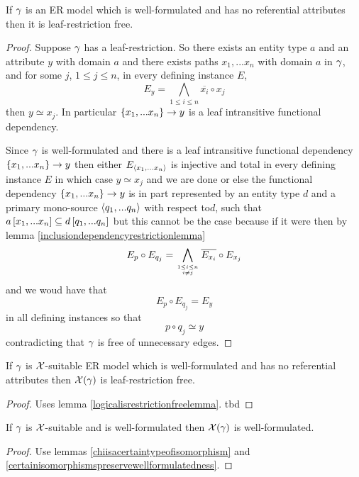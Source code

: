 \begin{lemma}
\label{logicalisrestrictionfreelemma}
If $\gamma$ is an ER model which is well-formulated and has no referential attributes 
then it is leaf-restriction free.
\end{lemma}
\begin{proof}
Suppose $\gamma$ has a leaf-restriction. So there exists an
entity type $a$ and an attribute $y$ with domain $a$ and there 
exists paths $x_1,...x_n$   with domain
$a$ in $\gamma$,  and for some $j$, $1 \leq j \leq n$, in every defining instance $E$,  
$$E_y = \bigwedge_{1 \leq i \leq n}{\overline{x_i}} \circ x_j$$then $y \simeq x_j$. In particular
$\left\{x_1,...x_n\right\} \rightarrow y$ is a leaf intransitive functional dependency. 

Since $\gamma$ is well-formulated  and there is a leaf intransitive functional dependency $\left\{x_1,...x_n\right\} \rightarrow y$ then either $E_{\langle x_1,...x_n\rangle}$ is injective and total in every defining instance $E$  in which case $y \simeq x_j$  and we are done  or else the functional dependency $\left\{x_1,...x_n\right\} \rightarrow y$   is in part represented by  an entity type $d$ and a primary mono-source $\langle q_1,...q_n\rangle$ with respect to$d$, such that $a\left[x_1,...x_n\right]\subseteq d\left[q_1,...q_n\right]$ but this cannot be the case because if it were then by lemma \ref{inclusiondependencyrestrictionlemma}
$$E_p \circ E_{q_j} = \bigwedge\limits_{\genfrac{}{}{0pt}{}{1 \leq i \leq n}{ i \neq j}}{\overline{E_{x_i}}}\circ E_{x_j}$$
and we woud have that
$$E_p \circ E_{q_j} = E_y$$
in all defining instances so that
$$p \circ q_j \simeq y$$
contradicting that $\gamma$ is free of unnecessary edges. 
\end{proof}

\begin{lemma}
\label{restrictioncarrythroughlemma}
If $\gamma$ is $\mathcal{X}$-suitable ER model which is well-formulated and has no referential attributes 
then $\mathcal{X}(\gamma)$ is leaf-restriction free.
\end{lemma}
\begin{proof}
Uses lemma  \ref{logicalisrestrictionfreelemma}.
\vspace{0.5cm}
tbd
\end{proof}



\begin{lemma}
\label{wfcarrythroughlemma}
If  $\gamma$ is $\mathcal{X}$-suitable and is well-formulated then  $\mathcal{X}(\gamma)$ is well-formulated. 
\end{lemma}
\begin{proof}
Use lemmas \ref{chiisacertaintypeofisomorphism} and \ref{certainisomorphismspreservewellformulatedness}.
\end{proof}


